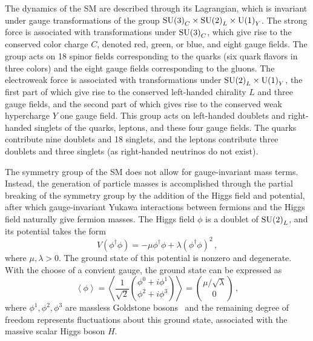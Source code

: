 The dynamics of the SM are described through its Lagrangian, which is invariant under
gauge transformations of the group ${\rm SU(3)}_C \times {\rm SU(2)}_L \times {\rm U(1)}_Y$.
The strong force is associated with transformations under ${\rm SU(3)}_C$, which give rise to
the conserved color charge $C$, denoted red, green, or blue, and eight gauge fields.
The group acts on 18 spinor fields corresponding to the quarks (six quark flavors in three colors)
and the eight gauge fields corresponding to the gluons.
The electroweak force is associated with transformations under ${\rm SU(2)}_L \times {\rm U(1)}_Y$,
the first part of which give rise to the conserved left-handed chirality $L$ and three gauge fields,
and the second part of which gives rise to the conserved weak hypercharge $Y$ one gauge field.
This group acts on left-handed doublets and right-handed singlets of the quarks, leptons, and
these four gauge fields. The quarks contribute nine doublets and 18 singlets, and the leptons contribute
three doublets and three singlets (as right-handed neutrinos do not exist).

The symmetry group of the SM does not allow for gauge-invariant mass terms. Instead,
the generation of particle masses is accomplished through the partial breaking of the
symmetry group by the addition of the Higgs field and potential, after which gauge-invariant
Yukawa interactions between fermions and the Higgs field naturally give fermion masses.
The Higgs field $\phi$ is a doublet of ${\rm SU(2)}_L$, and its potential takes the form
\begin{equation}
V(\phi^\dagger\phi) = -\mu\phi^\dagger\phi + \lambda(\phi^\dagger\phi)^2 \,,
\end{equation}
where $\mu,\lambda > 0$. The ground state of this potential is nonzero and degenerate. With the
choose of a convient gauge, the ground state can be expressed as
\begin{equation}
\left\langle \phi \right\rangle =
\left\langle \frac{1}{\sqrt{2}} {\phi^0+i\phi^1 \choose \phi^2+i\phi^3} \right\rangle =
{\mu / \sqrt{\lambda} \choose 0} \,,
\end{equation}
where $\phi^1, \phi^2, \phi^3$ are massless Goldstone
bosons~\cite{1961.Goldstone,1962.Goldstone-Salam-Weinberg.Broken-Symmetries} and the remaining
degree of freedom represents fluctuations about this ground state,
associated with the massive scalar Higgs boson $H$.

